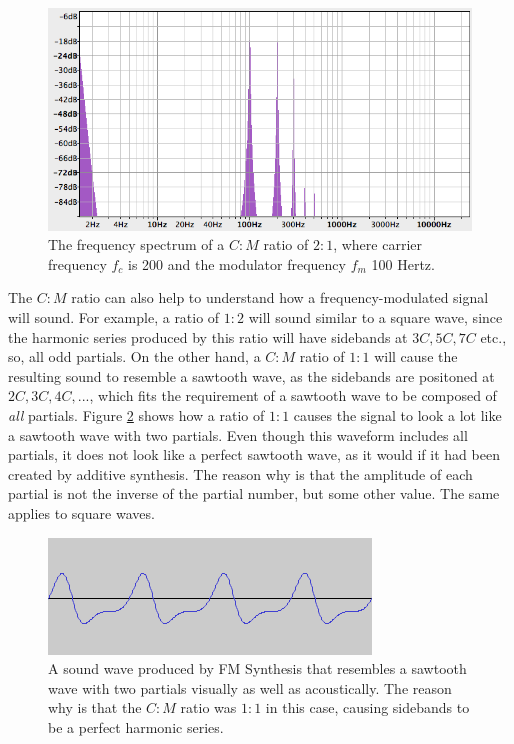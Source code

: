 \documentclass[12pt,twoside]{report}
\begin{document}
\begin{figure}[]
  \includegraphics[scale=0.5]{img/sb}
  \caption{The frequency spectrum of a $C:M$ ratio of $2:1$, where carrier frequency $f_{c}$ is 200 and the modulator frequency $f_{m}$ 100 Hertz.}
  \label{fig:sb}
\end{figure}

\pagebreak

\noindent The $C:M$ ratio can also help to understand how a frequency-modulated signal will sound. For example, a ratio of $1:2$ will sound similar to a square wave, since the harmonic series produced by this ratio will have sidebands at $3C, 5C, 7C$ etc., so, all odd partials. On the other hand, a $C:M$ ratio of $1:1$ will cause the resulting sound to resemble a sawtooth wave, as the sidebands are positoned at $2C, 3C, 4C, ...$, which fits the requirement of a sawtooth wave to be composed of \emph{all} partials. Figure \ref{fig:fmsaw} shows how a ratio of $1:1$ causes the signal to look a lot like a sawtooth wave with two partials. Even though this waveform includes all partials, it does not look like a perfect sawtooth wave, as it would if it had been created by additive synthesis. The reason why is that the amplitude of each partial is not the inverse of the partial number, but some other value. The same applies to square waves.\\

\begin{figure}[]
  \includegraphics[scale=0.7]{img/fmsaw}
  \caption{A sound wave produced by FM Synthesis that resembles a sawtooth wave with two partials visually as well as acoustically. The reason why is that the $C:M$ ratio was $1:1$ in this case, causing sidebands to be a perfect harmonic series.}
  \label{fig:fmsaw}
\end{figure}
\end{document}
